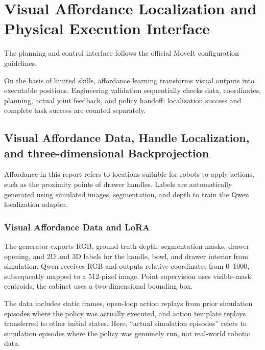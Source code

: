\chapter{Visual Affordance Localization and Physical Execution Interface}
The planning and control interface follows the official MoveIt configuration guidelines\cite{moveit}.


On the basis of limited skills, affordance learning transforms visual outputs into executable positions. Engineering validation sequentially checks data, coordinates, planning, actual joint feedback, and policy handoff; localization success and complete task success are counted separately.

\section{Visual Affordance Data, Handle Localization, and three-dimensional Backprojection}

\label{stage:s17}

Affordance in this report refers to locations suitable for robots to apply actions, such as the proximity points of drawer handles. Labels are automatically generated using simulated images, segmentation, and depth to train the Qwen localization adapter.

\subsection{Visual Affordance Data and LoRA}\label{s17-detail-1}

The generator exports RGB, ground-truth depth, segmentation masks, drawer opening, and 2D and 3D labels for the handle, bowl, and drawer interior from simulation. Qwen receives RGB and outputs relative coordinates from 0--1000, subsequently mapped to a 512-pixel image. Point supervision uses visible-mask centroids; the cabinet uses a two-dimensional bounding box.

The data includes static frames, open-loop action replays from prior simulation episodes where the policy was actually executed, and action template replays transferred to other initial states. Here, ``actual simulation episodes'' refers to simulation episodes where the policy was genuinely run, not real-world robotic data.

